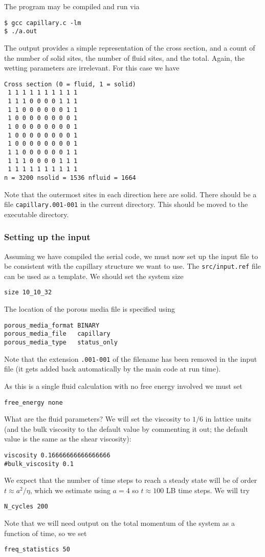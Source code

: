 The program may be compiled and run via
\begin{verbatim}
$ gcc capillary.c -lm
$ ./a.out
\end{verbatim}
The output provides a simple representation of the cross section,
and a count of the number of solid sites, the number of fluid sites,
and the total. Again, the wetting parameters are irrelevant. For this
case we have
\begin{verbatim}
Cross section (0 = fluid, 1 = solid)
 1 1 1 1 1 1 1 1 1 1
 1 1 1 0 0 0 0 1 1 1
 1 1 0 0 0 0 0 0 1 1
 1 0 0 0 0 0 0 0 0 1
 1 0 0 0 0 0 0 0 0 1
 1 0 0 0 0 0 0 0 0 1
 1 0 0 0 0 0 0 0 0 1
 1 1 0 0 0 0 0 0 1 1
 1 1 1 0 0 0 0 1 1 1
 1 1 1 1 1 1 1 1 1 1
n = 3200 nsolid = 1536 nfluid = 1664
\end{verbatim}
Note that the outermost sites in each direction here are solid. There
should be a file \texttt{capillary.001-001} in the current directory.
This should be moved to the executable directory.


\subsubsection{Setting up the input}

Assuming we have compiled the serial code, we must now set up the
input file to be consistent with the capillary structure we want
to use. The \texttt{src/input.ref} file can be used as a template.
We should set the system size
\begin{verbatim}
size 10_10_32
\end{verbatim}
The location of the porous media file is specified using
\begin{verbatim}
porous_media_format BINARY
porous_media_file   capillary
porous_media_type   status_only
\end{verbatim}
Note that the extension \texttt{.001-001} of the filename has been
removed in the input file (it gets added back automatically by the
main code at run time).

As this is a single fluid calculation with no free energy involved
we must set
\begin{verbatim}
free_energy none
\end{verbatim}
What are the fluid parameters? We will set the viscosity to
$1/6$ in lattice units (and the bulk viscosity to the default
value by commenting it out; the default value is the same as
the shear viscosity):
\begin{verbatim}
viscosity 0.16666666666666666
#bulk_viscosity 0.1
\end{verbatim}
We expect that the number of time steps to reach a steady state
will be of order $t \approx a^2/\eta$, which we estimate using
$a=4$ so $t \approx 100$ LB time steps. We will try
\begin{verbatim}
N_cycles 200
\end{verbatim}
Note that we will need output on the total momentum of the system
as a function of time, so we set
\begin{verbatim}
freq_statistics 50
\end{verbatim}


